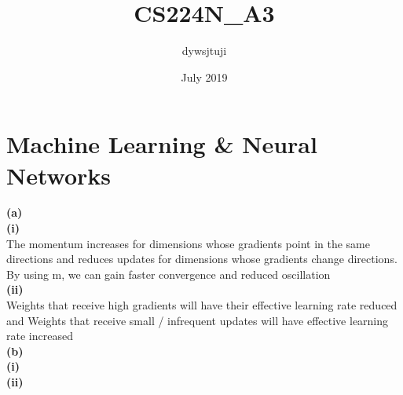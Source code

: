 \documentclass{article}
\title{CS224N_A3}
\author{dywsjtuji }
\date{July 2019}
\begin{document}
\maketitle

\section{Machine Learning & Neural Networks}

\textbf{(a)}\\
\textbf{(i)}\\
The momentum increases for dimensions whose gradients point in the same directions and reduces updates for dimensions whose gradients change directions. By using m, we can gain faster convergence and reduced oscillation
\\
\textbf{(ii)}\\
Weights that receive high gradients will have their effective learning rate reduced and Weights that receive small / infrequent updates will have effective learning rate increased\\
\textbf{(b)}\\
\textbf{(i)}\\
\textbf{(ii)}\\
\end{document}
